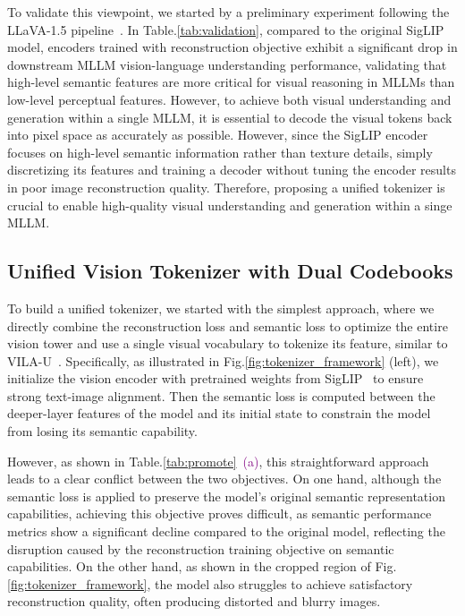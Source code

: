 To validate this viewpoint, we started by a preliminary experiment following the LLaVA-1.5 pipeline~\citep{liu2024llava1d5}.
In Table.\ref{tab:validation}, compared to the original SigLIP model, encoders trained with reconstruction objective exhibit a significant drop in downstream MLLM vision-language understanding performance, validating that high-level semantic features are more critical for visual reasoning in MLLMs than low-level perceptual features.
However, to achieve both visual understanding and generation within a single MLLM, it is essential to decode the visual tokens back into pixel space as accurately as possible. However, since the SigLIP encoder focuses on high-level semantic information rather than texture details, simply discretizing its features and training a decoder without tuning the encoder results in poor image reconstruction quality. %
Therefore, proposing a unified tokenizer is crucial to enable high-quality visual understanding and generation within a singe MLLM.



\subsection{Unified Vision Tokenizer with Dual Codebooks}
\label{sec:method_tokenizer}

To build a unified tokenizer, we started with the simplest approach, where we directly combine the reconstruction loss and semantic loss to optimize the entire vision tower and use a single visual vocabulary to tokenize its feature, similar to VILA-U~\citep{wu2025vilau}.
Specifically, as illustrated in Fig.\ref{fig:tokenizer_framework} (left), we initialize the vision encoder with pretrained weights from SigLIP~\citep{zhai2023siglip} to ensure strong text-image alignment. Then the semantic loss is computed between the deeper-layer features of the model and its initial state to constrain the model from losing its semantic capability.

However, as shown in Table.\ref{tab:promote}~\textcolor{purple}{(a)}, this straightforward approach leads to a clear conflict between the two objectives. On one hand, although the semantic loss is applied to preserve the model's original semantic representation capabilities, achieving this objective proves difficult, as semantic performance metrics show a significant decline compared to the original model, reflecting the disruption caused by the reconstruction training objective on semantic capabilities. On the other hand, as shown in the cropped region of Fig.\ref{fig:tokenizer_framework}, the model also struggles to achieve satisfactory reconstruction quality, often producing distorted and blurry images.

